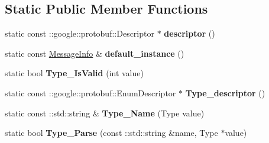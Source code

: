 \subsection*{Static Public Member Functions}
\begin{DoxyCompactItemize}
\item 
\hypertarget{classstruct_definitions_1_1_message_info_a085c6dab457a126516a754ed9ce6c91b}{}\label{classstruct_definitions_1_1_message_info_a085c6dab457a126516a754ed9ce6c91b} 
static const \+::google\+::protobuf\+::\+Descriptor $\ast$ {\bfseries descriptor} ()
\item 
\hypertarget{classstruct_definitions_1_1_message_info_adcf537c8c42afa63d2f2b2277c2ca97f}{}\label{classstruct_definitions_1_1_message_info_adcf537c8c42afa63d2f2b2277c2ca97f} 
static const \hyperlink{classstruct_definitions_1_1_message_info}{Message\+Info} \& {\bfseries default\+\_\+instance} ()
\item 
\hypertarget{classstruct_definitions_1_1_message_info_aceeca829af5652b03f84e47b84b49083}{}\label{classstruct_definitions_1_1_message_info_aceeca829af5652b03f84e47b84b49083} 
static bool {\bfseries Type\+\_\+\+Is\+Valid} (int value)
\item 
\hypertarget{classstruct_definitions_1_1_message_info_a8e330e0ff3f0ab3854c1197717fc0ee5}{}\label{classstruct_definitions_1_1_message_info_a8e330e0ff3f0ab3854c1197717fc0ee5} 
static const \+::google\+::protobuf\+::\+Enum\+Descriptor $\ast$ {\bfseries Type\+\_\+descriptor} ()
\item 
\hypertarget{classstruct_definitions_1_1_message_info_a89972d0cec19a90fef506866acc045d5}{}\label{classstruct_definitions_1_1_message_info_a89972d0cec19a90fef506866acc045d5} 
static const \+::std\+::string \& {\bfseries Type\+\_\+\+Name} (Type value)
\item 
\hypertarget{classstruct_definitions_1_1_message_info_a8b58ec1070062751c71e0bf49eeb022d}{}\label{classstruct_definitions_1_1_message_info_a8b58ec1070062751c71e0bf49eeb022d} 
static bool {\bfseries Type\+\_\+\+Parse} (const \+::std\+::string \&name, Type $\ast$value)
\end{DoxyCompactItemize}
